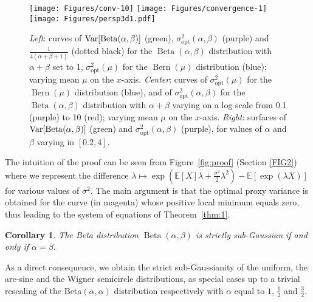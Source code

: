 \documentclass[15pt]{article}
\newcommand{\E}{\mathbb{E}}
\def\E{\mathbb{E}}
\DeclareMathOperator{\Beta}{Beta}
\DeclareMathOperator{\Bern}{Bern}
\theoremstyle{plain}
\newtheorem{cor}{{Corollary}}%
\begin{document}
\begin{figure}[!b]
\texttt{[image: Figures/conv-10]} 
\texttt{[image: Figures/convergence-1]} 
 \texttt{[image: Figures/persp3d1.pdf]}
\caption{\label{fig:proxy}
\textit{Left}: curves of $\text{\normalfont{Var}}[\Beta(\alpha,\beta)]$ (green), $\sigma_{\text{opt}}^2(\alpha,\beta)$ (purple) and $\frac{1}{4(\alpha+\beta+1)}$ (dotted black) for the $\Beta(\alpha,\beta)$ distribution with $\alpha+\beta$ set to 1, $\sigma_{\text{opt}}^2(\mu)$ for the $\Bern(\mu)$ distribution (blue); varying mean $\mu$ on the $x$-axis. 
\textit{Center}: curves of  $\sigma_{\text{opt}}^2(\mu)$ for the $\Bern(\mu)$ distribution  (blue), and of $\sigma_{\text{opt}}^2(\alpha,\beta)$ for the $\Beta(\alpha,\beta)$ distribution with $\alpha+\beta$ varying on a log scale from 0.1 (purple) to 10 (red); varying mean $\mu$ on the $x$-axis. 
\textit{Right}: surfaces of $\text{\normalfont{Var}}[\Beta(\alpha,\beta)]$ (green) and $\sigma_{\text{opt}}^2(\alpha,\beta)$ (purple), for values of $\alpha$ and $\beta$ varying in $[0.2, 4]$. %
}
\end{figure}
%
The intuition of the proof can be seen from Figure~\ref{fig:proof} (Section \ref{FIG2}) where we represent the difference $\lambda\mapsto\exp\left(\mathbb{E}[X]\lambda+\frac{\sigma^2}{2}\lambda^2\right)-\E[\exp(\lambda X)]$ for various values of $\sigma^2$. The main argument is that the optimal proxy variance is obtained for the curve (in magenta) whose positive local minimum equals zero, thus leading to the system of equations of Theorem~\ref{thm:1}. \bigskip
%
\begin{cor}\label{cor}
The Beta distribution $\Beta(\alpha,\beta)$ is strictly sub-Gaussian if and only if $\alpha=\beta$.
\end{cor}
%
As a direct consequence, we obtain the strict sub-Gaussianity of the uniform, the arc-sine and the Wigner semicircle distributions, as special cases up to a trivial rescaling of the Beta$(\alpha,\alpha)$ distribution respectively with $\alpha$ equal to $1$, $\frac{1}{2}$ and $\frac{3}{2}$.
\end{document}
